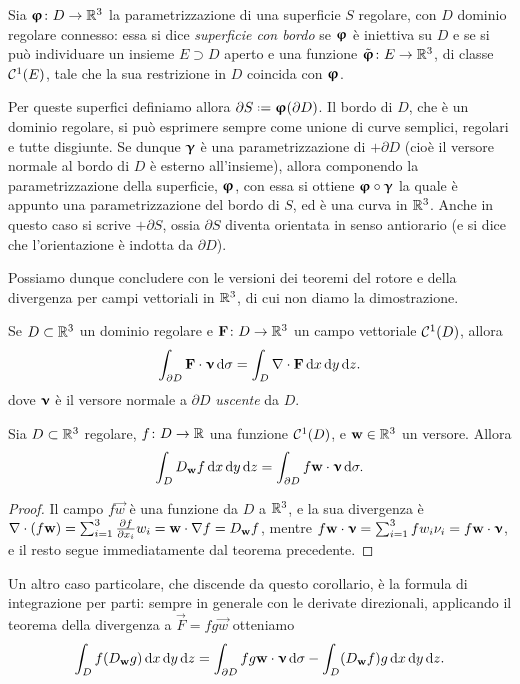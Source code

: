 \begin{definizione} \label{d:superfici-con-bordo}
	Sia $\bm{\upvarphi}\colon D\to\mathbb{R}^3$ la parametrizzazione di una superficie $S$ regolare, con $D$ dominio regolare connesso: essa si dice \emph{superficie con bordo} se $\bm{\upvarphi}$ è iniettiva su $D$ e se si può individuare un insieme $E\supset D$ aperto e una funzione $\tilde{\bm{\upvarphi}}\colon E\to\mathbb{R}^3$, di classe $\mathcal{C}^{{1}}(E)$, tale che la sua restrizione in $D$ coincida con $\bm{\upvarphi}$.
\end{definizione}
Per queste superfici definiamo allora $\partial S\defeq\vphi(\partial D)$.
Il bordo di $D$, che è un dominio regolare, si può esprimere sempre come unione di curve semplici, regolari e tutte disgiunte.
Se dunque $\bm{\upgamma}$ è una parametrizzazione di $+\partial D$ (cioè il versore normale al bordo di $D$ è esterno all'insieme), allora componendo la parametrizzazione della superficie, $\bm{\upvarphi}$, con essa si ottiene $\bm{\upvarphi}\circ\bm{\upgamma}$ la quale è appunto una parametrizzazione del bordo di $S$, ed è una curva in $\mathbb{R}^3$.
Anche in questo caso si scrive $+\partial S$, ossia $\partial S$ diventa orientata in senso antiorario (e si dice che l'orientazione è indotta da $\partial D$).

Possiamo dunque concludere con le versioni dei teoremi del rotore e della divergenza per campi vettoriali in $\mathbb{R}^3$, di cui non diamo la dimostrazione.
\begin{teorema} \label{t:divergenza-R3}
	Se $D\subset\mathbb{R}^3$ un dominio regolare e $\mathbf{F}\colon D\to\mathbb{R}^3$ un campo vettoriale $\mathcal{C}^{{1}}(D)$, allora
	\begin{equation}
		\int_{\partial D}{\mathbf{F}}\cdot{\bm{\upnu}}\,\textup{d}\sigma=\int_D\nabla\cdot\mathbf{F}\,\textup{d} x\,\textup{d} y\,\textup{d} z.
		\label{eq:divergenza-R3}
	\end{equation}
	dove $\bm{\upnu}$ è il versore normale a $\partial D$ \emph{uscente} da $D$.
\end{teorema}
\begin{corollario}
	Sia $D\subset\mathbb{R}^3$ regolare, $f\colon D\to\mathbb{R}$ una funzione $\mathcal{C}^{{1}}(D)$, e $\mathbf{w}\in\mathbb{R}^3$ un versore.
	Allora
	\begin{equation}
		\int_DD_{\mathbf{w}}f\,\textup{d} x\,\textup{d} y\,\textup{d} z=\int_{\partial D}f{\mathbf{w}}\cdot{\bm{\upnu}}\,\textup{d}\sigma.
	\end{equation}
\end{corollario}
\begin{proof}
	Il campo $f\vec w$ è una funzione da $D$ a $\mathbb{R}^3$, e la sua divergenza è $\nabla\cdot(f\mathbf{w})=\sum_{i=1}^3\frac{\partial {f}}{\partial {x_i}}w_i={\mathbf{w}}\cdot{\nabla f}=D_{\mathbf{w}}f$, mentre ${f\mathbf{w}}\cdot{\bm{\upnu}}=\sum_{i=1}^3fw_i\nu_i=f{\mathbf{w}}\cdot{\bm{\upnu}}$, e il resto segue immediatamente dal teorema precedente.
\end{proof}
Un altro caso particolare, che discende da questo corollario, è la formula di integrazione per parti: sempre in generale con le derivate direzionali, applicando il teorema della divergenza a $\vec F=fg\vec w$ otteniamo
\begin{equation}
	\int_Df(D_{\mathbf{w}}g)\,\textup{d} x\,\textup{d} y\,\textup{d} z=\int_{\partial D}fg{\mathbf{w}}\cdot{\bm{\upnu}}\,\textup{d}\sigma-\int_D(D_{\mathbf{w}}f)g\,\textup{d} x\,\textup{d} y\,\textup{d} z.
\end{equation}

